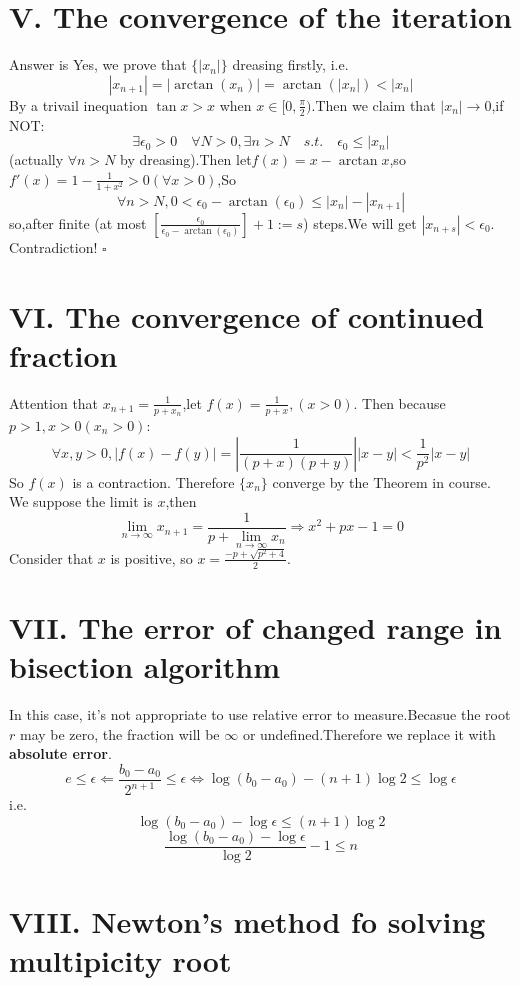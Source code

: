 \documentclass[a4paper]{article}
\begin{document}
\section*{V. The convergence of the iteration}
Answer is Yes, we prove that $\{|x_n|\}$ dreasing firstly, i.e.
\[
|x_{n+1}| = |\arctan (x_{n})| = \arctan(|x_n|) < |x_n|
\]
By a trivail inequation $\tan x > x $ when $x \in [0,\frac{\pi}{2} )$.Then
we claim that $|x_n|\rightarrow 0$,if NOT:
\[
\exists \epsilon_0 > 0\quad\forall N > 0,\exists n > N \quad s.t.  \quad \epsilon_0 \leqslant |x_n| 
\](actually $\forall n>N$ by dreasing).Then let$ f(x) = x - \arctan x$,so $f'(x) = 1 - \frac{1}{1+x^2} > 0 (\forall x > 0)$,So
\[
\forall n>N, 0 < \epsilon_0 - \arctan (\epsilon_0) \leqslant |x_n| - |x_{n+1}| 
\]
so,after finite (at most $[\frac{\epsilon_0}{\epsilon_0 - \arctan (\epsilon_0)}] + 1 := s$) steps.We will get $|x_{n+s}| < \epsilon_0$.
Contradiction!
\hfill$\square$

\section*{VI. The convergence of continued fraction}
Attention that $x_{n+1} = \frac{1}{p + x_n}$,let $f(x) = \frac{1}{p + x},(x > 0)$. Then because $p > 1,x > 0(x_n > 0)$:
\[
\forall x,y > 0,|f(x) - f(y)| = |\frac{1}{(p + x)(p+y)}||x-y| < \frac{1}{p^2}|x - y|
\]
So $f(x)$ is a contraction.
Therefore $\{x_n\}$ converge by the Theorem in course.
We suppose the limit is $x$,then
\[
\lim_{n\rightarrow \infty}x_{n+1} = \frac{1}{p + \lim_{n\rightarrow \infty}x_{n}} \Rightarrow x^2 + px - 1 = 0
\]
Consider that $x$ is positive, so $x = \frac{-p+\sqrt{p^2+4}}{2}$.

\section*{VII. The error of changed range in bisection algorithm}
In this case, it's not appropriate to use relative error to measure.Becasue the root $r$ may be zero, the fraction
will be $\infty$ or undefined.Therefore we replace it with \textbf{absolute error}.
\[
e \leqslant \epsilon \Leftarrow \frac{b_0 - a_0}{2^{n+1}} \leqslant \epsilon \iff \log(b_0 - a_0) - (n + 1)\log 2 \leqslant \log \epsilon
\]
i.e.
\[
 \log(b_0 - a_0) - \log \epsilon \leqslant (n + 1) \log2
\]
\[
\frac{ \log(b_0 - a_0) - \log \epsilon }{\log2} - 1\leqslant n 
\]

\section*{VIII. Newton's method fo solving multipicity root}
\end{document}

